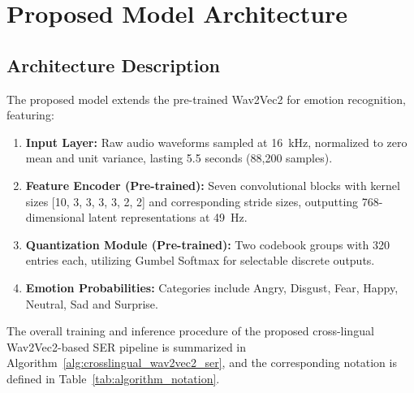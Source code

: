 \documentclass[conference]{IEEEtran}
\begin{document}
\section{Proposed Model Architecture}

\subsection{Architecture Description}

The proposed model extends the pre-trained Wav2Vec2 for emotion recognition, featuring:

\begin{enumerate}
  \item \textbf{Input Layer:} Raw audio waveforms sampled at 16~kHz, normalized to zero
        mean and unit variance, lasting 5.5 seconds (88,200 samples).
  \item \textbf{Feature Encoder (Pre-trained):} Seven convolutional blocks with kernel sizes
        [10, 3, 3, 3, 3, 2, 2] and corresponding stride sizes, outputting 768-dimensional
        latent representations at 49~Hz.
  \item \textbf{Quantization Module (Pre-trained):} Two codebook groups with 320 entries
        each, utilizing Gumbel Softmax for selectable discrete outputs.
  \item \textbf{Emotion Probabilities:} Categories include Angry, Disgust, Fear, Happy,
        Neutral, Sad and Surprise.
\end{enumerate}

The overall training and inference procedure of the proposed cross-lingual Wav2Vec2-based
SER pipeline is summarized in Algorithm~\ref{alg:crosslingual_wav2vec2_ser}, and the
corresponding notation is defined in Table~\ref{tab:algorithm_notation}.
\end{document}
